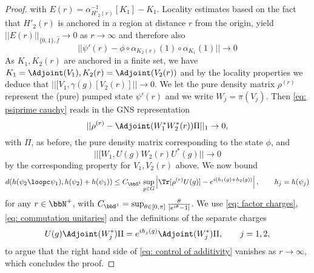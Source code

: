 \begin{proof}
	with $E(r)=\alpha^{-1}_{H'_2(r)}[K_1]-K_1$.  Locality estimates based on the fact that $H'_2(r)$ is anchored in a region at distance $r$ from the origin, yield  $||E(r)||_{\{0,1\},\hat{f}}\to 0$ as $r\to\infty$ and therefore also
	\begin{equation}\label{eq: psiprime cauchy}
	||   \psi'(r) -  \phi \circ \alpha_{K_2(r)}(1) \circ \alpha_{K_1}(1) || \to 0
	\end{equation}
	As $K_1,K_2(r)$ are anchored in a finite set, we have $K_1=\Adjoint(V_1), K_2(r)=\Adjoint(V_2(r)) $ and by the locality properties we deduce that  $ ||[V_1,\gamma(g)[V_2(r)]|| \to 0$.
	We let the pure density matrix $\rho^{(r)}$ represent the (pure) pumped state $\psi'(r)$ and we write $W_j = \pi(V_j)$.  Then \eqref{eq: psiprime cauchy} reads in the GNS representation
	\begin{equation}\label{eq: factor charges}
	|| \rho^{(r)}-  \Adjoint(W^*_1 W^*_2(r))\Pi  ||_1 \to 0,
	\end{equation}
	with $\Pi$, as before, the pure density matrix corresponding to the state $\phi$, and 
	\begin{equation}\label{eq: commutation unitaries}
	||[W_1,U(g)W_2(r)U^*(g)|| \to 0
	\end{equation}
	by the corresponding property for $V_1,V_2(r)$ above. We now bound
	\begin{equation} \label{eq: control of additivity}
	d(h(\psi_2\loopc\psi_1),h(\psi_2)+h(\psi_1)) \leq {C_{\bbS^1}}\sup_{g\in G}\left| \Tr [ \rho^{(r)} U(g)] - e^{i(h_1(g)+h_2(g))}   \right|, \qquad h_j=h(\psi_j)
	\end{equation}
	for any  $r\in\bbN^+$, with $C_{\bbS^1}=\sup_{\theta\in[0,\pi]}\frac{\theta}{|e^{i\theta}-1|}$.    We use \eqref{eq: factor charges}, \eqref{eq: commutation unitaries} and the definitions of the separate charges
	$$
	U(g)\Adjoint(W^*_j)\Pi =   e^{i h_j(g)}  \Adjoint(W^*_j)\Pi,\qquad  j=1,2,
	$$
	to argue that the right hand side of \eqref{eq: control of additivity} vanishes as $r\to\infty$, which concludes the proof. 

\end{proof}
